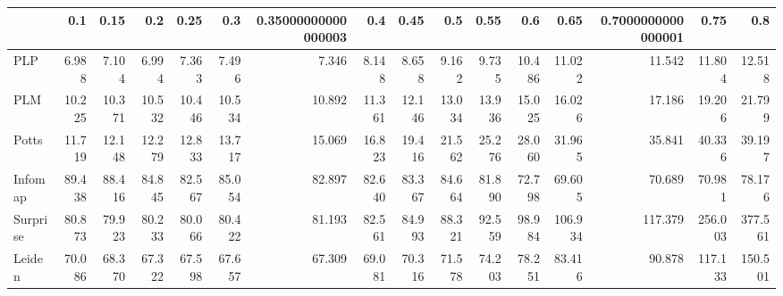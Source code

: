 \begin{tabular}{lrrrrrrrrrrrrrrr}
\toprule
{} &    0.1 &   0.15 &    0.2 &   0.25 &    0.3 & 0.35000000000000003 &    0.4 &   0.45 &    0.5 &   0.55 &    0.6 &    0.65 & 0.7000000000000001 &    0.75 &     0.8 \\
\midrule
PLP      &  6.988 &  7.104 &  6.994 &  7.363 &  7.496 &               7.346 &  8.148 &  8.658 &  9.162 &  9.735 & 10.486 &  11.022 &             11.542 &  11.804 &  12.518 \\
PLM      & 10.225 & 10.371 & 10.532 & 10.446 & 10.534 &              10.892 & 11.361 & 12.146 & 13.034 & 13.936 & 15.025 &  16.026 &             17.186 &  19.206 &  21.799 \\
Potts    & 11.719 & 12.148 & 12.279 & 12.833 & 13.717 &              15.069 & 16.823 & 19.416 & 21.562 & 25.276 & 28.060 &  31.965 &             35.841 &  40.336 &  39.197 \\
Infomap  & 89.438 & 88.416 & 84.845 & 82.567 & 85.054 &              82.897 & 82.640 & 83.367 & 84.664 & 81.890 & 72.798 &  69.605 &             70.689 &  70.981 &  78.176 \\
Surprise & 80.873 & 79.923 & 80.233 & 80.066 & 80.422 &              81.193 & 82.561 & 84.993 & 88.321 & 92.559 & 98.984 & 106.934 &            117.379 & 256.003 & 377.561 \\
Leiden   & 70.086 & 68.370 & 67.322 & 67.598 & 67.657 &              67.309 & 69.081 & 70.316 & 71.578 & 74.203 & 78.251 &  83.416 &             90.878 & 117.133 & 150.501 \\
\bottomrule
\end{tabular}
